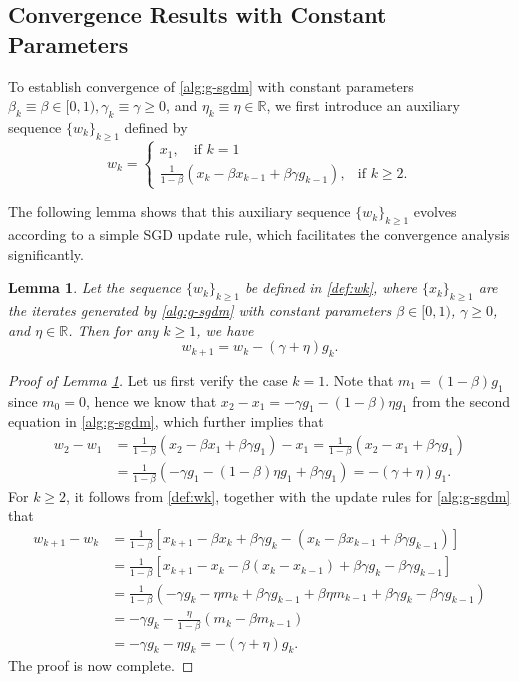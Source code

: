 \documentclass[10pt]{article}
\numberwithin{equation}{section}
\newtheorem{lemma}{Lemma}
\theoremstyle{definition}
\newcommand{\rbb}{\mathbb{R}}  %
\begin{document}
\subsection{Convergence Results with Constant Parameters}
To establish convergence of \eqref{alg:g-sgdm} with constant parameters $\beta_k\equiv\beta\in[0,1), \gamma_k\equiv\gamma\ge0$, and $\eta_k\equiv\eta\in\rbb$, we first introduce an auxiliary sequence $\{w_k\}_{k\ge 1}$ defined by
\begin{equation}\label{def:wk}
w_k= \begin{cases}x_1, \quad \text{if } k=1 &  \\ \frac{1}{1-\beta} (x_k-\beta x_{k-1}+\beta \gamma g_{k-1}), & \text{if } k \ge 2.\end{cases}
\end{equation}

The following lemma shows that this auxiliary sequence $\{w_k\}_{k\ge 1}$ evolves according to a simple SGD update rule, which facilitates the convergence analysis significantly.
\begin{lemma}\label{lem:w-sgd}
Let the sequence $\{w_k\}_{k\ge 1}$ be defined in \eqref{def:wk}, where $\{x_k\}_{k\ge 1}$ are the iterates generated by \eqref{alg:g-sgdm} with constant parameters $\beta\in [0,1)$, $\gamma\ge 0$, and $\eta\in\rbb$. Then for any $k\ge 1$, we have
\[
w_{k+1}=w_k-(\gamma+\eta) g_k.
\]
\end{lemma}
\begin{proof}[Proof of Lemma \ref{lem:w-sgd}]
Let us first verify the case $k=1$. Note that $m_1=(1-\beta)g_1$ since $m_0=0$, hence we know that $x_2 - x_1 = - \gamma g_1-(1-\beta)\eta g_1$ from the second equation in \eqref{alg:g-sgdm}, which further implies that
\begin{align*}
w_2-w_1 & = \frac{1}{1-\beta}(x_2-\beta x_1+\beta \gamma g_1)-x_1 = \frac{1}{1-\beta}(x_2- x_1+\beta \gamma g_1) \\
& =\frac{1}{1-\beta}(-\gamma g_1-(1-\beta)\eta g_1+\beta \gamma g_1)=-(\gamma+\eta) g_1.
\end{align*}
For $k\ge 2$, it follows from \eqref{def:wk}, together with the update rules for \eqref{alg:g-sgdm} that
\begin{align*}
w_{k+1}-w_k & = \frac{1}{1-\beta}[x_{k+1}-\beta x_k+\beta \gamma g_k-(x_k-\beta x_{k-1}+\beta \gamma g_{k-1})] \\
& = \frac{1}{1-\beta}[x_{k+1}-x_k-\beta(x_k-x_{k-1})+\beta \gamma g_k-\beta \gamma g_{k-1}] \\
& = \frac{1}{1-\beta}(-\gamma g_k-\eta m_k+\beta \gamma g_{k-1}+\beta \eta m_{k-1}+\beta \gamma g_k-\beta \gamma g_{k-1}) \\
& = -\gamma g_k-\frac{\eta}{1-\beta}(m_k-\beta m_{k-1}) \\
& = - \gamma g_k-\eta g_k =- (\gamma+\eta) g_k.
\end{align*}
The proof is now complete.
\end{proof}
\end{document}
